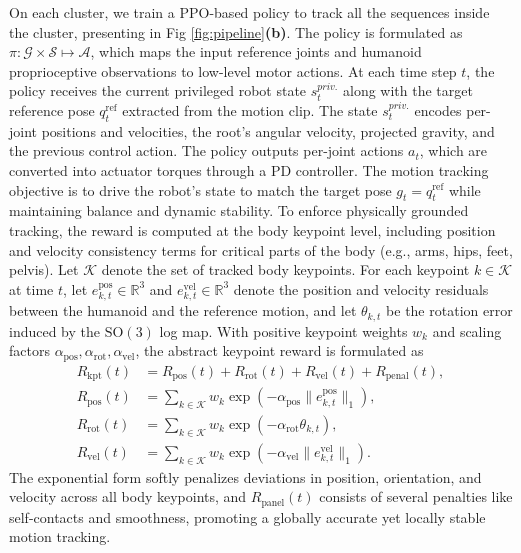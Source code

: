 \documentclass{llmxive}
\begin{document}
On each cluster, we train a PPO-based policy to track all the sequences inside the cluster, presenting in Fig \ref{fig:pipeline}\textbf{(b)}. The policy is formulated as $\pi: \mathcal{G} \times \mathcal{S} \mapsto \mathcal{A}$, which maps the input reference joints and humanoid proprioceptive observations to low-level motor actions. At each time step $t$, the policy receives the current privileged robot state $s_t^{priv.}$ along with the target reference pose $q_t^{\text{ref}}$ extracted from the motion clip. The state $s_t^{priv.}$ encodes per-joint positions and velocities, the root’s angular velocity, projected gravity, and the previous control action. The policy outputs per-joint actions $a_t$, which are converted into actuator torques through a PD controller. 
The motion tracking objective is to drive the robot's state to match the 
target pose $g_t = q_t^{\text{ref}}$ while maintaining balance and dynamic stability. 
To enforce physically grounded tracking, the reward is computed at the body keypoint level, including position and velocity consistency terms for critical parts of the body (e.g., arms, hips, feet, pelvis). Let $\mathcal{K}$ denote the set of tracked body keypoints. For each keypoint $k\!\in\!\mathcal{K}$ at time $t$, let $e^{\text{pos}}_{k,t}\!\in\!\mathbb{R}^3$ and $e^{\text{vel}}_{k,t}\!\in\!\mathbb{R}^3$ denote the position and velocity residuals between the humanoid and the reference motion, and let $\theta_{k,t}$ be the rotation error induced by the $\mathrm{SO}(3)$ log map.  With positive keypoint weights $w_k$ and scaling factors 
$\alpha_{\text{pos}}, \alpha_{\text{rot}}, \alpha_{\text{vel}}$,  
the abstract keypoint reward is formulated as
\begin{equation}
\begin{aligned}
R_{\text{kpt}}(t) &= R_{\text{pos}}(t) + R_{\text{rot}}(t) + R_{\text{vel}}(t) + R_{\text{penal}}(t),\\
R_{\text{pos}}(t) &= \sum_{k\in\mathcal{K}} w_k \exp\!\left(-\alpha_{\text{pos}}\|e^{\text{pos}}_{k,t}\|_{1}\right),\\
R_{\text{rot}}(t) &= \sum_{k\in\mathcal{K}} w_k \exp\!\left(-\alpha_{\text{rot}}\theta_{k,t}\right),\\
R_{\text{vel}}(t) &= \sum_{k\in\mathcal{K}} w_k \exp\!\left(-\alpha_{\text{vel}}\|e^{\text{vel}}_{k,t}\|_{1}\right).
\end{aligned}
\end{equation}
The exponential form softly penalizes deviations in position, orientation, 
and velocity across all body keypoints, and $R_{\text{panel}}(t)$ consists of several penalties like self-contacts and smoothness, promoting a globally accurate yet locally stable motion tracking.
\end{document}
